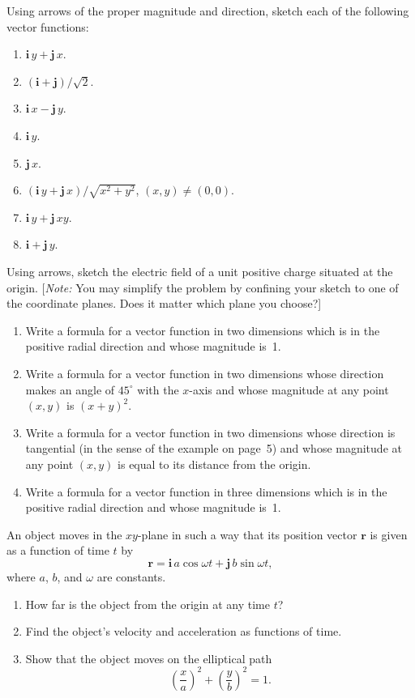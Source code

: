 \begin{problems}

\prob %
Using arrows of the proper magnitude and direction, sketch each of the following vector functions:
\begin{enumerate}[label=(\alph*)]
\setlength{\itemsep}{2pt}
\item $\mathbf{i}\,y + \mathbf{j}\,x$.
\item $(\mathbf{i} + \mathbf{j})/\sqrt{2}$.
\item $\mathbf{i}\,x - \mathbf{j}\,y$.
\item $\mathbf{i}\,y$.
\item $\mathbf{j}\,x$.
\item $(\mathbf{i}\,y + \mathbf{j}\,x)/\sqrt{x^2 + y^2}$, $(x, y) \neq (0, 0)$.
\item $\mathbf{i}\,y + \mathbf{j}\,xy$.
\item $\mathbf{i} + \mathbf{j}\,y$.
\end{enumerate}

\prob %
Using arrows, sketch the electric field of a unit positive charge situated at the origin. [\emph{Note:} You may simplify the problem by confining your sketch to one of the coordinate planes. Does it matter which plane you choose?]

\prob %
\begin{enumerate}[label=(\alph*)]
\item Write a formula for a vector function in two dimensions which is in the positive radial direction and whose magnitude is~1.
\item Write a formula for a vector function in two dimensions whose direction makes an angle of $45^\circ$ with the $x$-axis and whose magnitude at any point $(x, y)$ is $(x + y)^2$.
\item Write a formula for a vector function in two dimensions whose direction is tangential (in the sense of the example on page~5) and whose magnitude at any point $(x, y)$ is equal to its distance from the origin.
\item Write a formula for a vector function in three dimensions which is in the positive radial direction and whose magnitude is~1.
\end{enumerate}

\prob %
An object moves in the $xy$-plane in such a way that its position vector $\mathbf{r}$ is given as a function of time $t$ by
\[
\mathbf{r} = \mathbf{i}\,a \cos \omega t + \mathbf{j}\,b \sin \omega t,
\]
where $a$, $b$, and $\omega$ are constants.
\begin{enumerate}[label=(\alph*)]
\item How far is the object from the origin at any time $t$?
\item Find the object's velocity and acceleration as functions of time.
\item Show that the object moves on the elliptical path
\[
\left(\frac{x}{a}\right)^2 + \left(\frac{y}{b}\right)^2 = 1.
\]
\end{enumerate}


\end{problems}
